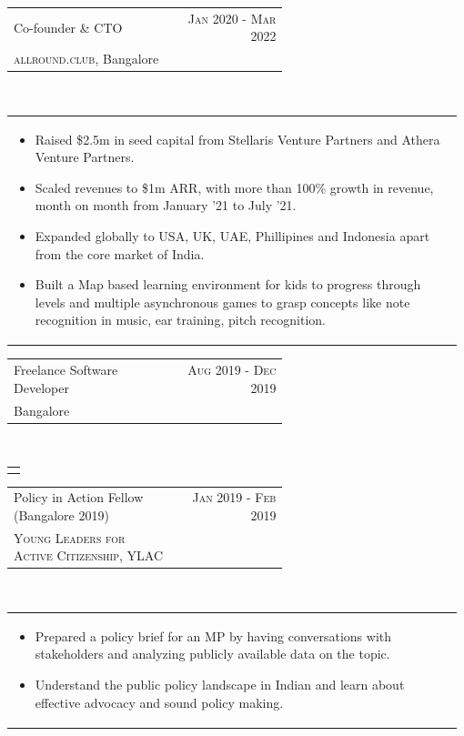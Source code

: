 \documentclass[a4paper]{article} %
\newcommand{\verticalspacing}{-0.25cm}
\newcommand{\bulletspace}{0.7cm}
\newcommand{\projectheadspacing}{6.9cm}
\newcommand{\cproject}[5]{%
    \begin{tabular}{p{0.60\linewidth}r}
        \textcolor{NavyBlue}{\small #2} & \multicolumn{1}{m{ \projectheadspacing{} }}{\raggedleft \small {\textsc{#1}}}\\
        \small {#3} & \small {#4}
    \end{tabular}\\
    \begin{tabular}{p{0.98\linewidth}}
    \vspace{-0.3cm}
        \small{#5}
    \end{tabular}
    \vspace{\verticalspacing{}}
}
\begin{document}
\cproject
      {Jan 2020 - Mar 2022}
      {Co-founder \& CTO}
      {\textsc{allround.club}, Bangalore}
      {}
      {%
        \begin{itemize}[leftmargin=\bulletspace{}]
            \item Raised \$2.5m in seed capital from Stellaris Venture Partners and Athera Venture Partners.
            \item Scaled revenues to \$1m ARR, with more than 100\% growth in revenue, month on month from January '21
                to July '21.
            \item Expanded globally to USA, UK, UAE, Phillipines and Indonesia apart from the core market of India.
            \item Built a Map based learning environment for kids to progress through levels and multiple asynchronous
                games to grasp concepts like note recognition in music, ear training, pitch recognition.
        \end{itemize}
      }

\cproject
      {Aug 2019 - Dec 2019}
      {Freelance Software Developer}
      {Bangalore}
      {}
      {%
      }

\cproject
      {Jan 2019 - Feb 2019}
      {Policy in Action Fellow (Bangalore 2019)}
      {\textsc{Young Leaders for Active Citizenship}, YLAC}
      {}
      {%
        \begin{itemize}[leftmargin=\bulletspace{}]
            \item Prepared a policy brief for an MP by having conversations with stakeholders and analyzing publicly available data on the topic.
            \item Understand the public policy landscape in Indian and learn about effective advocacy and sound policy making.
        \end{itemize}
      }
\end{document}
